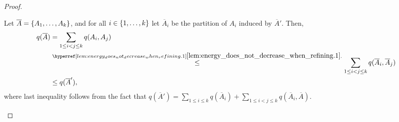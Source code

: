 \begin{lemma}
\begin{proof}
\begin{enumerate}
                        Let $\overline{A} = \{ A_1, \dots, A_k \}$, and for all $i \in \{ 1, \dots, k \}$ let
                        $\overline{A}_i$ be the partition of $A_i$ induced by $\overline{A}'$.
                        Then,
                        \begin{align*}
                            q(\overline{A})
                                & = \sum_{1 \leq i < j \leq k} q(A_i, A_j) \\
                                & \stackrel{\dref{lem:energy_does_not_decrease_when_refining.1}}{\leq}
                                    \sum_{1 \leq i < j \leq k} q(\overline{A}_i, \overline{A}_j) \\
                                & \leq q(\overline{A}'),
                        \end{align*}
                        where last inequality follows from the fact that
                        $q(\overline{A}') = \sum_{1 \leq i \leq k} q(\overline{A}_i) + \sum_{1 \leq i < j \leq k} q(\overline{A}_i, \overline{A})$.
                \end{enumerate}
            \end{proof}
        \end{lemma}

